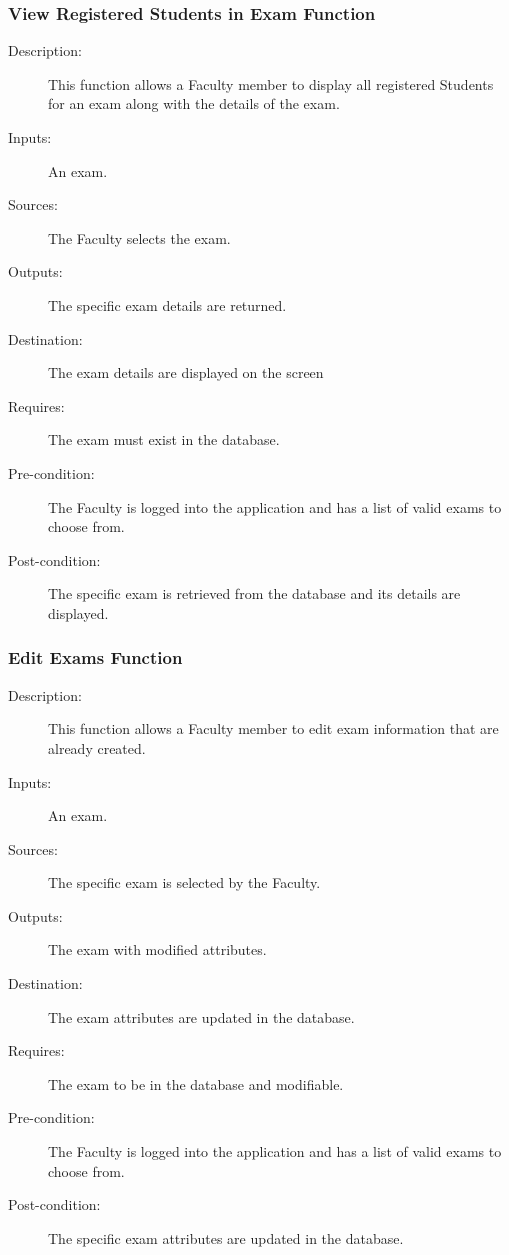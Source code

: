 \subsubsection{\large View Registered Students in Exam Function} 
\begin{boxed} %
\small\begin{description}
\item[Description:]
   This function allows a Faculty member to display all registered Students for
   an exam along with the details of the exam.
\item[Inputs:]
   An exam.
\item[Sources:]
   The Faculty selects the exam.
\item[Outputs:]
   The specific exam details are returned.
\item[Destination:]
   The exam details are displayed on the screen
\item[Requires:]
   The exam must exist in the database.
\item[Pre-condition:]
   The Faculty is logged into the application and has a list of valid exams
   to choose from.
\item[Post-condition:]
   The specific exam is retrieved from the database and its details are
   displayed.
\end{description}
\normalsize
\end{boxed} %

\subsubsection{\large Edit Exams Function} 
\begin{boxed} %
\small\begin{description}
\item[Description:]
   This function allows a Faculty member to edit exam information that are
   already created.
\item[Inputs:]
   An exam.
\item[Sources:]
   The specific exam is selected by the Faculty.
\item[Outputs:]
   The exam with modified attributes.
\item[Destination:]
   The exam attributes are updated in the database.
\item[Requires:]
   The exam to be in the database and modifiable.
\item[Pre-condition:]
   The Faculty is logged into the application and has a list of valid exams to
   choose from.
\item[Post-condition:]
   The specific exam attributes are updated in the database.
\end{description}
\normalsize
\end{boxed} %

